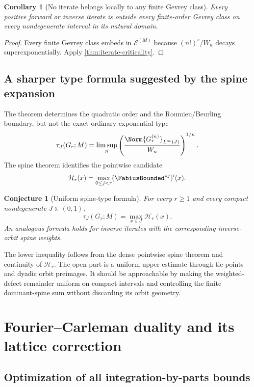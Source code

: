 \documentclass[11pt,a4paper]{article}
\newtheorem{corollary}[theorem]{Corollary}
\newtheorem{conjecture}[theorem]{Conjecture}
\theoremstyle{definition}
\theoremstyle{remark}
\newcommand{\comp}{\mathbin{\circ}}
\newcommand{\Beurling}[1]{\mathcal{E}^{(#1)}}
\begin{document}
\begin{corollary}[No iterate belongs locally to any finite Gevrey class]
Every positive forward or inverse iterate is outside every finite-order Gevrey class
on every nondegenerate interval in its natural domain.
\end{corollary}

\begin{proof}
Every finite Gevrey class embeds in $\Beurling{M}$ because
$(n!)^s/W_n$ decays superexponentially.  Apply
\cref{thm:iterate-criticality}.
\end{proof}

\subsection{A sharper type formula suggested by the spine expansion}

The theorem determines the quadratic order and the Roumieu/Beurling boundary, but
not the exact ordinary-exponential type
\[
  \tau_J(G_r;M)=
  \limsup_n\left(
  \frac{\Norm{G_r^{(n)}}_{L^\infty(J)}}{W_n}
  \right)^{1/n}.
\]
The spine theorem identifies the pointwise candidate
\[
  \mathcal H_r(x)=
  \max_{0\le j<r}(\FabiusBounded^{\comp j})'(x).
\]

\begin{conjecture}[Uniform spine-type formula]
\label{conj:uniform-type}
For every $r\ge1$ and every compact nondegenerate $J\Subset(0,1)$,
\begin{equation}
  \tau_J(G_r;M)=\max_{x\in J}\mathcal H_r(x).
  \label{eq:uniform-type-conj}
\end{equation}
An analogous formula holds for inverse iterates with the corresponding inverse-orbit
spine weights.
\end{conjecture}

The lower inequality follows from the dense pointwise spine theorem and continuity
of $\mathcal H_r$.  The open part is a uniform upper estimate through tie points and
dyadic orbit preimages.  It should be approachable by making the weighted-defect
remainder uniform on compact intervals and controlling the finite dominant-spine
sum without discarding its orbit geometry.

\section{Fourier--Carleman duality and its lattice correction}
\label{sec:fourier-dual}

\subsection{Optimization of all integration-by-parts bounds}
\end{document}
